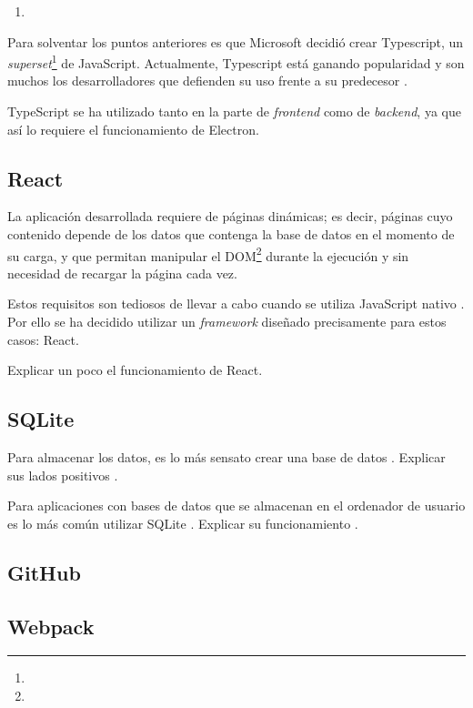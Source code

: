 \begin{enumerate}
	\item 
\end{enumerate}

Para solventar los puntos anteriores es que Microsoft decidió crear Typescript, un \textit{superset}\footnote{\todo} de JavaScript. Actualmente, Typescript está ganando popularidad y son muchos los desarrolladores que defienden su uso frente a su predecesor \citationNeeded.

TypeScript se ha utilizado tanto en la parte de \textit{frontend} como de \textit{backend}, ya que así lo requiere el funcionamiento de Electron.

\subsection{React}

La aplicación desarrollada requiere de páginas dinámicas; es decir, páginas cuyo contenido depende de los datos que contenga la base de datos en el momento de su carga, y que permitan manipular el DOM\footnote{\todo} durante la ejecución y sin necesidad de recargar la página cada vez.

Estos requisitos son tediosos de llevar a cabo cuando se utiliza JavaScript nativo \citationNeeded. Por ello se ha decidido utilizar un \textit{framework} diseñado precisamente para estos casos: React.

Explicar un poco el funcionamiento de React. \todo

\subsection{SQLite}

Para almacenar los datos, es lo más sensato crear una base de datos \citationNeeded. Explicar sus lados positivos \todo.

Para aplicaciones con bases de datos que se almacenan en el ordenador de usuario es lo más común utilizar SQLite \citationNeeded. Explicar su funcionamiento \todo.

\subsection{GitHub}

\subsection{Webpack}

